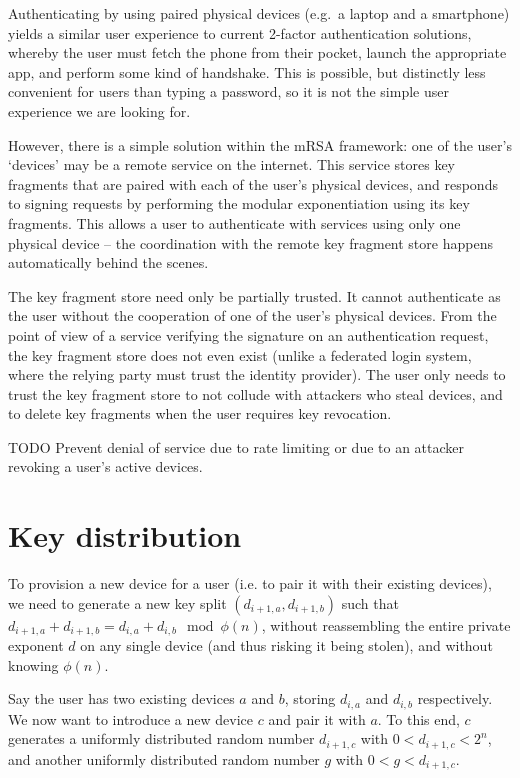 Authenticating by using paired physical devices (e.g.\ a laptop and a smartphone) yields a similar
user experience to current 2-factor authentication solutions, whereby the user must fetch the phone
from their pocket, launch the appropriate app, and perform some kind of handshake. This is possible,
but distinctly less convenient for users than typing a password, so it is not the simple user
experience we are looking for.

However, there is a simple solution within the mRSA framework: one of the user's `devices' may be a
remote service on the internet. This service stores key fragments that are paired with each of the
user's physical devices, and responds to signing requests by performing the modular exponentiation
using its key fragments. This allows a user to authenticate with services using only one physical
device -- the coordination with the remote key fragment store happens automatically behind the
scenes.

The key fragment store need only be partially trusted. It cannot authenticate as the user without
the cooperation of one of the user's physical devices. From the point of view of a service verifying
the signature on an authentication request, the key fragment store does not even exist (unlike a
federated login system, where the relying party must trust the identity provider). The user only
needs to trust the key fragment store to not collude with attackers who steal devices, and to delete
key fragments when the user requires key revocation.

TODO Prevent denial of service due to rate limiting or due to an attacker revoking a user's active
devices.

\section{Key distribution}

To provision a new device for a user (i.e. to pair it with their existing devices), we need to
generate a new key split $(d_{i+1,a}, d_{i+1,b})$ such that
$d_{i+1,a} + d_{i+1,b} = d_{i,a} + d_{i,b} \mod \phi(n)$, without reassembling the entire private
exponent $d$ on any single device (and thus risking it being stolen), and without knowing $\phi(n)$.

Say the user has two existing devices $a$ and $b$, storing $d_{i,a}$ and $d_{i,b}$ respectively. We
now want to introduce a new device $c$ and pair it with $a$. To this end, $c$ generates a uniformly
distributed random number $d_{i+1,c}$ with $0 < d_{i+1,c} < 2^n$, and another uniformly distributed
random number $g$ with $0 < g < d_{i+1,c}$.

